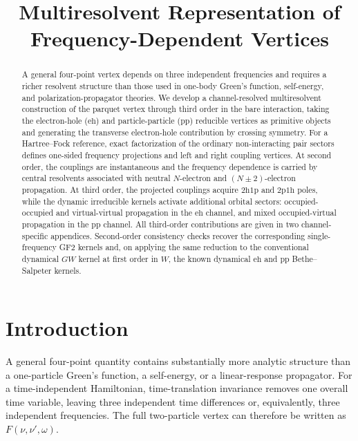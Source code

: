 \documentclass[aip,jcp,reprint,noshowkeys,superscriptaddress]{revtex4-1}
\newcommand{\hhp}{\text{2h1p}}
\newcommand{\pph}{\text{2p1h}}
\newcommand{\eh}{\text{eh}}
\newcommand{\pp}{\text{pp}}
\newcommand{\LCPQ}{Laboratoire de Chimie et Physique Quantiques (UMR 5626), Universit\'e de Toulouse, CNRS, UPS, France}
\begin{document}
\title{Multiresolvent Representation of Frequency-Dependent Vertices}


\begin{abstract}
A general four-point vertex depends on three independent frequencies and requires a richer resolvent structure than those used in one-body Green's function, self-energy, and polarization-propagator theories.
We develop a channel-resolved multiresolvent construction of the parquet vertex through third order in the bare interaction, taking the electron-hole ($\eh$) and particle-particle ($\pp$) reducible vertices as primitive objects and generating the transverse electron-hole contribution by crossing symmetry.
For a Hartree--Fock reference, exact factorization of the ordinary non-interacting pair sectors defines one-sided frequency projections and left and right coupling vertices.
At second order, the couplings are instantaneous and the frequency dependence is carried by central resolvents associated with neutral $N$-electron and $(N\pm2)$-electron propagation.
At third order, the projected couplings acquire $\hhp$ and $\pph$ poles, while the dynamic irreducible kernels activate additional orbital sectors: occupied-occupied and virtual-virtual propagation in the $\eh$ channel, and mixed occupied-virtual propagation in the $\pp$ channel.
All third-order contributions are given in two channel-specific appendices.
Second-order consistency checks recover the corresponding single-frequency GF2 kernels and, on applying the same reduction to the conventional dynamical $GW$ kernel at first order in $W$, the known dynamical $\eh$ and $\pp$ Bethe--Salpeter kernels.
\end{abstract}

\maketitle


\section{Introduction}
\label{sec:introduction}

A general four-point quantity contains substantially more analytic
structure than a one-particle Green's function, a self-energy, 
or a linear-response propagator.
For a time-independent Hamiltonian, time-translation invariance removes
one overall time variable, leaving three independent time differences or,
equivalently, three independent frequencies.
The full two-particle vertex can therefore be written as
$F(\nu,\nu',\omega)$.\cite{StarkeKresse2012}
\end{document}
